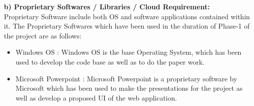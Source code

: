 \begin{itemize}
\end{itemize}
{\textbf{b) Proprietary Softwares / Libraries / Cloud Requirement:}}\\ 
Proprietary Software include both OS and software applications contained within it. The Proprietary Softwares which have been used in the duration of Phase-1 of the project are as follows:
\begin{itemize}
    \item Windows OS : Windows OS is the base Operating System, which has been used to develop the code base as well as to do the paper work.
    \item Microsoft Powerpoint : Microsoft Powerpoint is a proprietary software by Microsoft which has been used to make the presentations for the project as well as develop a proposed UI of the web application.
\end{itemize}
